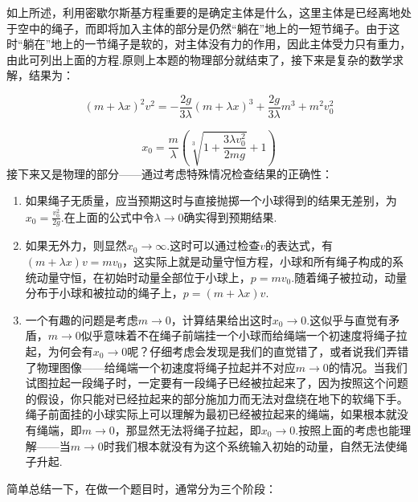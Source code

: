 \documentclass{ctexart}
\begin{document}
\begin{myexample}
\begin{enumerate}[leftmargin=*, labelsep=0.5em]
    如上所述，利用密歇尔斯基方程重要的是确定主体是什么，这里主体是已经离地处于空中的绳子，而即将加入主体的部分是仍然“躺在”地上的一短节绳子。由于这时“躺在”地上的一节绳子是软的，对主体没有力的作用，因此主体受力只有重力，由此可列出上面的方程.原则上本题的物理部分就结束了，接下来是复杂的数学求解，结果为：
  
    \begin{equation*}
    (m + \lambda x)^{2}v^{2} = - \frac{2g}{3\lambda}(m + \lambda x)^{3} + \frac{2g}{3\lambda}m^{3} + m^{2}v_{0}^{2}
    \end{equation*}

    \begin{equation*}
    x_{0} = \frac{m}{\lambda}\left( \sqrt[3]{1 + \frac{3\lambda v_{0}^{2}}{2mg}} + 1 \right)
    \end{equation*}
    接下来又是物理的部分——通过考虑特殊情况检查结果的正确性：
    
    \begin{enumerate}[leftmargin=*, labelsep=0.5em]
      \item 如果绳子无质量，应当预期这时与直接抛掷一个小球得到的结果无差别，为$x_{0} = \frac{v_{0}^{2}}{2g}$.在上面的公式中令$\lambda \rightarrow 0$确实得到预期结果.
      \item 如果无外力，则显然$x_{0} \rightarrow \infty$.这时可以通过检查$v$的表达式，有$(m + \lambda x)v = mv_{0}$，这实际上就是动量守恒方程，小球和所有绳子构成的系统动量守恒，在初始时动量全部位于小球上，$p = mv_{0}$.随着绳子被拉动，动量分布于小球和被拉动的绳子上，$p = (m + \lambda x)v$.
      \item 一个有趣的问题是考虑$m \rightarrow 0$，计算结果给出这时$x_{0} \rightarrow 0$.这似乎与直觉有矛盾，$m \rightarrow 0$似乎意味着不在绳子前端挂一个小球而给绳端一个初速度将绳子拉起，为何会有$x_{0} \rightarrow 0$呢？仔细考虑会发现是我们的直觉错了，或者说我们弄错了物理图像——给绳端一个初速度将绳子拉起并不对应$m \rightarrow 0$的情况。当我们试图拉起一段绳子时，一定要有一段绳子已经被拉起来了，因为按照这个问题的假设，你只能对已经拉起来的部分施加力而无法对盘绕在地下的软绳下手。绳子前面挂的小球实际上可以理解为最初已经被拉起来的绳端，如果根本就没有绳端，即$m \rightarrow 0$，那显然无法将绳子拉起，即$x_{0} \rightarrow 0$.按照上面的考虑也能理解——当$m \rightarrow 0$时我们根本就没有为这个系统输入初始的动量，自然无法使绳子升起.
    \end{enumerate}
    
    简单总结一下，在做一个题目时，通常分为三个阶段：
    

\end{enumerate}
\end{myexample}
\end{document}
